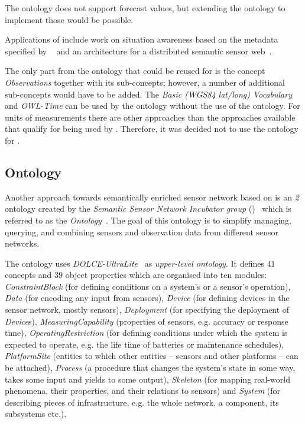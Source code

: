 The  ontology does not support forecast values, but extending the  ontology to implement those would be possible.

Applications of  include work on situation awareness based on the metadata specified by ~\cite{ssw_example1} and an architecture for a distributed semantic sensor web~\cite{ssw_example2}.

The only part from the  ontology that could be reused for \smarthomeweather is the concept \emph{Observations} together with its sub-concepts; however, a number of additional sub-concepts would have to be added. The \emph{Basic (WGS84 lat/long) Vocabulary} and \emph{OWL-Time} can be used by the \smarthomeweather ontology without the use of the  ontology. For units of measurements there are other approaches than the  approaches available that qualify for being used by \smarthomeweather. Therefore, it was decided not to use the  ontology for \smarthomeweather.

\vspace{1em}

\subsection{ Ontology}
\label{subsec:onto2}

Another approach towards semantically enriched sensor network based on  is an \emph{ 2} ontology created by the \emph{ Semantic Sensor Network Incubator group} ()~\cite{SSN-XG} which is referred to as the \emph{ Ontology}~\cite{ssn_ontology}. The goal of this ontology is to simplify managing, querying, and combining sensors and observation data from different sensor networks. 

The  ontology uses \emph{DOLCE-UltraLite}~\cite{dul} as \emph{upper-level ontology}. It defines $41$ concepts and $39$ object properties which are organised into ten modules: \emph{ConstraintBlock} (for defining conditions on a system's or a sensor's operation), \emph{Data} (for encoding any input from sensors), \emph{Device} (for defining devices in the sensor network, mostly sensors), \emph{Deployment} (for specifying the deployment of \emph{Device}s), \emph{MeasuringCapability} (properties of sensors, e.g. accuracy or response time), \emph{OperatingRestriction} (for defining conditions under which the system is expected to operate, e.g. the life time of batteries or maintenance schedules), \emph{PlatformSite} (entities to which other entities -- sensors and other platforms -- can be attached), \emph{Process} (a procedure that changes the system's state in some way, takes some input and yields to some output), \emph{Skeleton} (for mapping real-world phenomena, their properties, and their relations to sensors) and \emph{System} (for describing pieces of infrastructure, e.g. the whole network, a component, its subsystems etc.).

